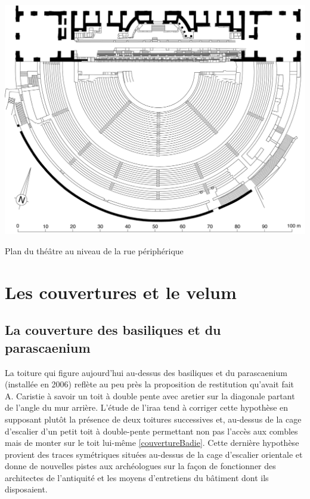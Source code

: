 	\begin{figureth}
		\includegraphics[width=\linewidth]{images/3emeniveau}
		\caption[Vue de dessus - 3ème niveau]{Plan du théâtre au niveau de la rue périphérique \cite[Pl. XIX]{orangePl}}
		\label{3emeniveau}
	\end{figureth}	
		
		
		\section{Les couvertures et le velum}
		
		\subsection{La couverture des \glspl{basilique} et du \gls{parascaenium}}
		
		La toiture qui figure aujourd'hui au-dessus des \glspl{basilique} et du \gls{parascaenium} (installée en 2006) reflète au peu près la proposition de restitution qu'avait fait A. Caristie à savoir un toit à double pente avec \gls{aretier} sur la diagonale partant de l'angle du mur arrière. L'étude de l'\gls{iraa} tend à corriger cette hypothèse en supposant plutôt la présence de deux toitures successives et, au-dessus de la cage d’escalier d’un petit toit à double-pente permettant non pas l’accès aux combles mais de monter sur le toit lui-même \ref{couvertureBadie}. Cette dernière hypothèse provient des traces symétriques situées au-dessus de la cage d’escalier orientale et donne de nouvelles pistes aux archéologues sur la façon de fonctionner des architectes de l'antiquité et les moyens d'entretiens du bâtiment dont ils disposaient. 
		
